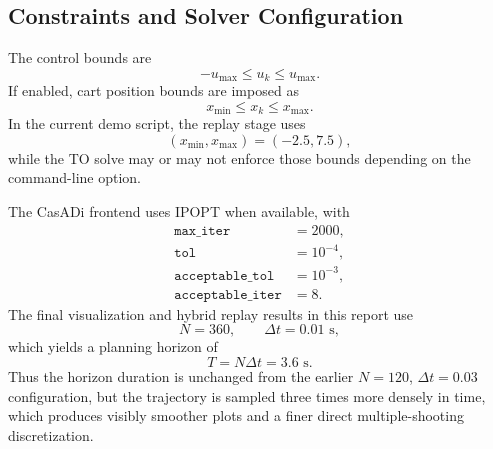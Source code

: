 \documentclass[conference]{IEEEtran}
\begin{document}
\subsection{Constraints and Solver Configuration}
The control bounds are
\begin{equation}
-u_{\max}\le u_k \le u_{\max}.
\end{equation}
If enabled, cart position bounds are imposed as
\begin{equation}
x_{\min}\le x_k \le x_{\max}.
\end{equation}
In the current demo script, the replay stage uses
\begin{equation}
(x_{\min},x_{\max}) = (-2.5,7.5),
\end{equation}
while the TO solve may or may not enforce those bounds depending on the command-line option.

The CasADi frontend uses IPOPT when available, with
\begin{align}
\texttt{max\_iter} &= 2000, \\
\texttt{tol} &= 10^{-4}, \\
\texttt{acceptable\_tol} &= 10^{-3}, \\
\texttt{acceptable\_iter} &= 8.
\end{align}
The final visualization and hybrid replay results in this report use
\begin{equation}
N=360, \qquad \Delta t=0.01 \text{ s},
\end{equation}
which yields a planning horizon of
\begin{equation}
T = N \Delta t = 3.6 \text{ s}.
\end{equation}
Thus the horizon duration is unchanged from the earlier $N=120$, $\Delta t=0.03$ configuration, but the trajectory is sampled three times more densely in time, which produces visibly smoother plots and a finer direct multiple-shooting discretization.
\end{document}
